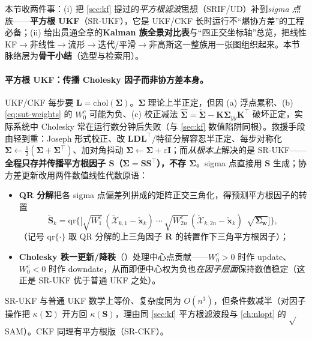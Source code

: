 本节收两件事：(i) 把 \cref{sec:kf} 提过的\emph{平方根滤波}思想（SRIF/UD）补到\emph{sigma 点}族——\textbf{平方根 UKF}（SR-UKF），它是 UKF/CKF 长时运行不“爆协方差”的工程必备；(ii) 给出贯通全章的\textbf{Kalman 族全景对比表}与“四正交坐标轴”总览，把线性 KF$\to$非线性$\to$流形$\to$迭代/平滑$\to$非高斯这一整族用一张图组织起来。本节脉络层为\textbf{骨干小结}（选型与检索用）。

\paragraph{平方根 UKF：传播 Cholesky 因子而非协方差本身。}
UKF/CKF 每步要 $\mathbf{L}=\mathrm{chol}(\boldsymbol{\Sigma})$。$\boldsymbol{\Sigma}$ 理论上半正定，但因 (a) 浮点累积、(b) \cref{eq:sut-weights} 的 $W_0^c$ 可能为负、(c) 校正减法 $\hat{\boldsymbol{\Sigma}}=\check{\boldsymbol{\Sigma}}-\mathbf{K}\boldsymbol{\Sigma}_{yy}\mathbf{K}^\top$ 破坏正定，实际系统中 Cholesky 常在运行数分钟后失败（与 \cref{sec:kf} 数值陷阱同根）。救援手段由轻到重：Joseph 形式校正、改 $\mathbf{L}\mathbf{D}\mathbf{L}^\top$/特征分解容忍半正定、每步对称化 $\boldsymbol{\Sigma}\leftarrow\tfrac12(\boldsymbol{\Sigma}+\boldsymbol{\Sigma}^\top)$、加对角抖动 $\boldsymbol{\Sigma}\leftarrow\boldsymbol{\Sigma}+\varepsilon\mathbf{I}$；而\emph{从根本上}解决的是 SR-UKF\cite{vandermerwe2004sigma}——\textbf{全程只存并传播平方根因子 $\mathbf{S}$（$\boldsymbol{\Sigma}=\mathbf{S}\mathbf{S}^\top$），不存 $\boldsymbol{\Sigma}$}。sigma 点直接用 $\mathbf{S}$ 生成；协方差更新改用两件数值线性代数原语：

\begin{itemize}
  \item \textbf{QR 分解}把各 sigma 点偏差列拼成的矩阵正交三角化，得预测平方根因子的转置
  \begin{equation}
    \check{\mathbf{S}}_k=\mathrm{qr}\Big\{\big[\sqrt{W_1^c}\,(\check{\boldsymbol{\mathcal{X}}}_{k,1}-\check{\mathbf{x}}_k)\ \cdots\ \sqrt{W_{2n}^c}\,(\check{\boldsymbol{\mathcal{X}}}_{k,2n}-\check{\mathbf{x}}_k)\ \ \sqrt{\boldsymbol{\Sigma}_{\mathbf{w}}}\big]\Big\},
    \label{eq:srukf-qr}
  \end{equation}
  （记号 $\mathrm{qr}\{\cdot\}$ 取 QR 分解的上三角因子 $\mathbf{R}$ 的转置作下三角平方根因子）；
  \item \textbf{Cholesky 秩一更新/降秩}（\verb@cholupdate@）处理中心点贡献——$W_0^c>0$ 时作 update、$W_0^c<0$ 时作 downdate，从而即便中心权为负也\emph{在因子层面}保持数值稳定（这正是 SR-UKF 优于普通 UKF 之处）。
\end{itemize}
SR-UKF 与普通 UKF 数学上等价、复杂度同为 $O(n^3)$，但条件数减半（对因子操作把 $\kappa(\boldsymbol{\Sigma})$ 开方回 $\kappa(\mathbf{S})$，理由同 \cref{sec:kf} 平方根滤波段与 \cref{ch:nlopt} 的 $\sqrt{}$SAM）。CKF 同理有平方根版（SR-CKF）。

